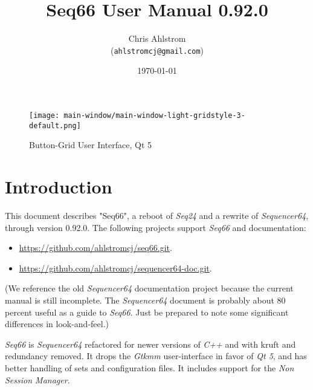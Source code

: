 \documentclass[
 11pt,
 twoside,
 a4paper,
 headinclude,
 footinclude,
 final                                 %
]{article}
\begin{document}
\title{Seq66 User Manual 0.92.0}
\author{Chris Ahlstrom \\
   (\texttt{ahlstromcj@gmail.com})}
\date{\today}
\maketitle

\begin{figure}[H]
   \centering 
   \texttt{[image: main-window/main-window-light-gridstyle-3-default.png]}
   \caption*{Button-Grid User Interface, Qt 5}
\end{figure}

\clearpage                             %

\tableofcontents
\listoffigures                         %
\listoftables                          %


\setlength{\parindent}{2em}
\setlength{\parskip}{1ex plus 0.5ex minus 0.2ex}
\rhead{\rightmark}         %

\section{Introduction}
\label{sec:introduction}

   This document describes "Seq66", a reboot of \textsl{Seq24} and a rewrite of
   \textsl{Sequencer64}, through version 0.92.0.
   The following projects support \textsl{Seq66} and documentation:

   \begin{itemize}
      \item \url{https://github.com/ahlstromcj/seq66.git}.
      \item \url{https://github.com/ahlstromcj/sequencer64-doc.git}.
   \end{itemize}

   (We reference the old \textsl{Sequencer64} documentation project because
   the current manual is still incomplete.  The \textsl{Sequencer64}
   document is probably about 80 percent useful as a guide to \textsl{Seq66}.
   Just be prepared to note some significant differences in look-and-feel.)

   \textsl{Seq66} is \textsl{Sequencer64} refactored for newer versions of
   \textsl{C++} and with kruft and redundancy removed.  It drops the
   \textsl{Gtkmm} user-interface in favor of \textsl{Qt 5},
   and has better handling of sets and configuration files.
   It includes support for the \textsl{Non Session Manager}.
\end{document}
